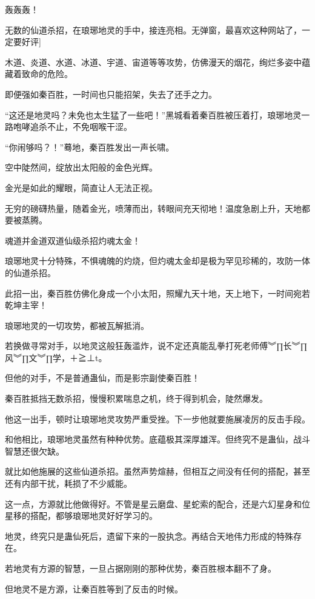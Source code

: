 
\begin{this_body}

轰轰轰！

无数的仙道杀招，在琅琊地灵的手中，接连亮相。无弹窗，最喜欢这种网站了，一定要好评]

木道、炎道、水道、冰道、宇道、宙道等等攻势，仿佛漫天的烟花，绚烂多姿中蕴藏着致命的危险。

即便强如秦百胜，一时间也只能招架，失去了还手之力。

“这还是地灵吗？未免也太生猛了一些吧！”黑城看着秦百胜被压着打，琅琊地灵一路咆哮追杀不止，不免咽喉干涩。

“你闹够吗？！”蓦地，秦百胜发出一声长啸。

空中陡然间，绽放出太阳般的金色光辉。

金光是如此的耀眼，简直让人无法正视。

无穷的磅礴热量，随着金光，喷薄而出，转眼间充天彻地！温度急剧上升，天地都要被蒸腾。

魂道并金道双道仙级杀招灼魂太金！

琅琊地灵十分特殊，不惧魂魄的灼烧，但灼魂太金却是极为罕见珍稀的，攻防一体的仙道杀招。

此招一出，秦百胜仿佛化身成一个小太阳，照耀九天十地，天上地下，一时间宛若乾坤主宰！

琅琊地灵的一切攻势，都被瓦解抵消。

若换做寻常对手，以地灵这般狂轰滥炸，说不定还真能乱拳打死老师傅︾∏长︾∏风︾∏文︾∏学，＋≧⊥t。

但他的对手，不是普通蛊仙，而是影宗副使秦百胜！

秦百胜抵挡无数杀招，慢慢积累喘息之机，终于得到机会，陡然爆发。

他这一出手，顿时让琅琊地灵攻势严重受挫。下一步他就要施展凌厉的反击手段。

和他相比，琅琊地灵虽然有种种优势。底蕴极其深厚雄浑。但终究不是蛊仙，战斗智慧还很欠缺。

就比如他施展的这些仙道杀招。虽然声势煊赫，但相互之间没有任何的搭配，甚至还有内部干扰，耗损了不少威能。

这一点，方源就比他做得好。不管是星云磨盘、星蛇索的配合，还是六幻星身和位星移的搭配，都够琅琊地灵好好学习的。

地灵，终究只是蛊仙死后，遗留下来的一股执念。再结合天地伟力形成的特殊存在。

若地灵有方源的智慧，一旦占据刚刚的那种优势，秦百胜根本翻不了身。

但地灵不是方源，让秦百胜等到了反击的时候。


\end{this_body}
